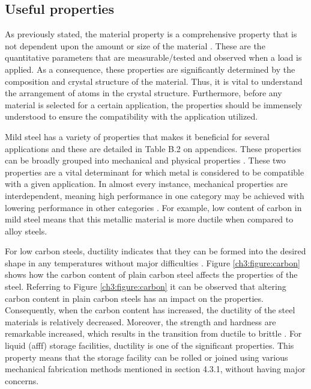 \subsection{Useful properties} 
As previously stated, the material property is a comprehensive property that is not dependent upon the amount or size of the material \cite{kabir2020critical}. These are the quantitative parameters that are measurable/tested and observed when a load is applied. As a consequence, these properties are significantly determined by the composition and crystal structure of the material. Thus, it is vital to understand the arrangement of atoms in the crystal structure. Furthermore, before any material is selected for a certain application, the properties should be immensely understood to ensure the compatibility with the application utilized.

Mild steel has a variety of properties that makes it beneficial for several applications and these are detailed in Table B.2 on appendices. These properties can be broadly grouped into mechanical and physical properties \cite{kabir2020critical}. These two properties are a vital determinant for which metal is considered to be compatible with a given application. In almost every instance, mechanical properties are interdependent, meaning high performance in one category may be achieved with lowering performance in other categories \cite{kabir2020critical}. For example, low content of carbon in mild steel means that this metallic material is more ductile when compared to alloy steels. 

For low carbon steels, ductility indicates that they can be formed into the desired shape in any temperatures without major difficulties \cite{dong2005deformation}. Figure \ref{ch3:figure:carbon} shows how the carbon content of plain carbon steel affects the properties of the steel. Referring to Figure \ref{ch3:figure:carbon} it can be observed that altering carbon content in plain carbon steels has an impact on the properties. Consequently, when the carbon content has increased, the ductility of the steel materials is relatively decreased. Moreover, the strength and hardness are remarkable increased, which results in the transition from ductile to brittle \cite{abou2001mechanical}. For liquid (\acrshort{afff}) storage facilities, ductility is one of the significant properties. This property means that the storage facility can be rolled or joined using various mechanical fabrication methods mentioned in section 4.3.1, without having major concerns.
 
